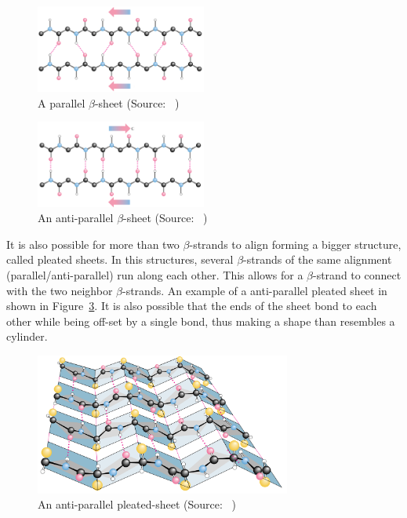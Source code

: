 \begin{figure}[htbp]
    \centering
    \includegraphics[width=0.5\textwidth]{Figuras/parallel-beta-sheet.png}
    \caption{A parallel $\beta$-sheet (Source: ~\cite{garrett1999biochemistry})}
    \label{fig:parallel-beta-sheet}
\end{figure}

\begin{figure}[htbp]
    \centering
    \includegraphics[width=0.5\textwidth]{Figuras/anti-parallel-beta-sheet.png}
    \caption{An anti-parallel $\beta$-sheet (Source: ~\cite{garrett1999biochemistry})}
    \label{fig:anti-parallel-beta-sheet}
\end{figure}

It is also possible for more than two $\beta$-strands to align forming a bigger structure, called
pleated sheets. In this structures, several $\beta$-strands of the same alignment (parallel/anti-parallel)
run along each other. This allows for a $\beta$-strand to connect with the two neighbor $\beta$-strands.
An example of a anti-parallel pleated sheet in shown in Figure~\ref{fig:pleated-sheet}. It is also
possible that the ends of the sheet bond to each other while being off-set by a single bond,
thus making a shape than resembles a cylinder.

\begin{figure}[htpb]
    \centering
    \includegraphics[width=0.75\textwidth]{Figuras/pleated-sheet.png}
    \caption{An anti-parallel pleated-sheet (Source: ~\cite{garrett1999biochemistry})}
    \label{fig:pleated-sheet}
\end{figure}

